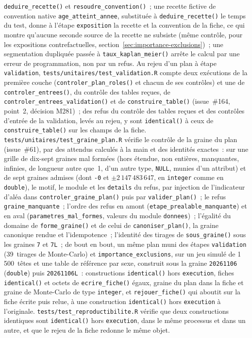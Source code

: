 \documentclass[a4paper,11pt]{article}
\newcommand{\code}[1]{\texttt{\small #1}}
\begin{document}
{\code{deduire\_recette()} et \code{resoudre\_convention()}~; une recette
fictive de convention native \code{age\_atteint\_annee}, substituée à
\code{deduire\_recette()} le temps du test, donne à l'étape
\code{exposition} la recette et la convention de la fiche, ce qui montre
qu'aucune seconde source de la recette ne subsiste (même contrôle, pour
les expositions contrefactuelles, section~\ref{sec:importance-exclusions})~;
une segmentation dupliquée passée à \code{taux\_kaplan\_meier()} arrête
le calcul par une erreur de programmation, non par un refus. Au rejeu d'un
plan à étape \code{validation}, \code{tests/unitaires/test\_validation.R}
compte deux exécutions de la première couche
(\code{controler\_plan\_roles()} et chacun de ses contrôles) et une de
\code{controler\_entrees()}, du contrôle des tables reçues, de
\code{controler\_entrees\_validation()} et de \code{construire\_table()}
(issue~\#164, point~2, décision M281)~; des refus du contrôle des tables
reçues et des contrôles d'entrée de la validation, levés au rejeu, y sont
\code{identical()} à ceux de \code{construire\_table()} sur les champs de
la fiche.
\code{tests/unitaires/test\_graine\_plan.R} vérifie le contrôle de la
graine du plan (issue~\#61), par des attendus calculés à la main et des
identités exactes~: sur une grille de dix-sept graines mal formées (hors
étendue, non entières, manquantes, infinies, de longueur autre que~1, d'un
autre type, \code{NULL}, munies d'un attribut) et de sept graines admises
(dont \code{-0} et $\pm 2\,147\,483\,647$, en \code{integer} comme en
\code{double}), le motif, le module et les \code{details} du refus, par
injection de l'indicateur d'aléa dans \code{controler\_graine\_plan()}
puis par \code{valider\_plan()}~; le refus \code{graine\_manquante}~;
l'ordre des refus en amont (\code{etape\_prealable\_manquante}) et en aval
(\code{parametres\_mal\_formes}, valeurs du module \code{donnees})~;
l'égalité du domaine de \code{forme\_graine()} et de celui de
\code{canoniser\_plan()}, la graine canonique rendue et l'idempotence~;
l'identité des tirages de \code{sous\_graine()} sous les graines
\code{7} et \code{7L}~; de bout en bout, un même plan muni des étapes
\code{validation} (39~tirages de Monte-Carlo) et
\code{importance\_exclusions}, sur un jeu simulé de 1\,500~têtes et une
table de référence par sexe, construit sous la graine \code{20261106}
(\code{double}) puis \code{20261106L}~: constructions \code{identical()}
hors \code{execution}, fiches \code{identical()} et octets de
\code{ecrire\_fiche()} égaux, graine du plan dans la fiche et graine de
Monte-Carlo de type \code{integer}, et \code{rejouer\_fiche()} qui aboutit
sur la fiche écrite puis relue, à une construction \code{identical()} hors
\code{execution} à l'originale.
\code{tests/test\_reproductibilite.R} vérifie que deux constructions
identiques sont \code{identical()} hors \code{execution}, dans le même
processus et dans un autre, et que le rejeu de la fiche redonne le même objet.\par}
\end{document}
